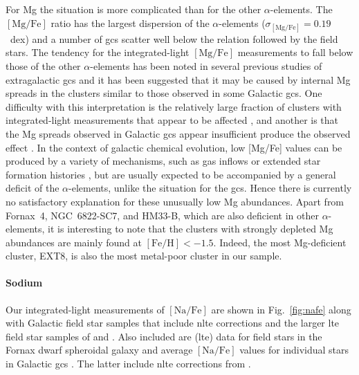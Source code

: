 \documentclass{aa}
\begin{document}
For Mg the situation is more complicated than for the other $\alpha$-elements. The $\mathrm{[Mg/Fe]}$ ratio has the largest dispersion of the $\alpha$-elements ($\sigma_\mathrm{[Mg/Fe]} = 0.19$~dex) and a number of \acp{gc} scatter well below the relation followed by the field stars. 
The tendency for the integrated-light $\mathrm{[Mg/Fe]}$ measurements to fall below those of the other $\alpha$-elements has been noted in several previous studies of extragalactic \acp{gc} \citep{Colucci2009,Colucci2014,Larsen2012a,Larsen2018,Sakari2015} and it has been suggested that it may be caused by internal Mg spreads in the clusters similar to those observed in some Galactic \acp{gc}.  One difficulty with this interpretation is the relatively large fraction of clusters with integrated-light measurements that appear to be affected \citep{Larsen2018}, and another is that the Mg spreads observed in Galactic \acp{gc} appear insufficient produce the observed effect \citep{Pancino2017}. 
In the context of galactic chemical evolution, low [Mg/Fe] values can be produced by a variety of mechanisms, such as gas inflows or extended star formation histories \citep{Buck2020,Buck2021}, but are usually expected to be accompanied by a general deficit of the $\alpha$-elements, unlike the situation for the \acp{gc}.
Hence there is currently no satisfactory explanation for these unusually low Mg abundances.
Apart from Fornax~4, NGC~6822-SC7, and HM33-B, which are also deficient in other $\alpha$-elements, it is interesting to note that the clusters with strongly depleted Mg abundances are mainly found at $\mathrm{[Fe/H]}<-1.5$. Indeed, the most Mg-deficient cluster, EXT8, is also the most metal-poor cluster in our sample. 

\paragraph{Sodium}

Our integrated-light measurements of $\mathrm{[Na/Fe]}$ are shown in Fig.~\ref{fig:nafe} along with 
Galactic field star samples that include \ac{nlte} corrections \citep{Gehren2004,Gehren2006,Mishenina2017,Mashonkina2017,Zhao2016} and the larger \ac{lte} field star samples of \citet[][V2004]{Venn2004} and \citet[][I2013]{Ishigaki2013}. Also included are (\ac{lte}) data for field stars in the Fornax dwarf spheroidal galaxy \citep[][L2010]{Letarte2010} and average $\mathrm{[Na/Fe]}$ values for individual stars in Galactic \acp{gc} . The latter include \ac{nlte} corrections from \citet{Gratton1999}.
\end{document}
